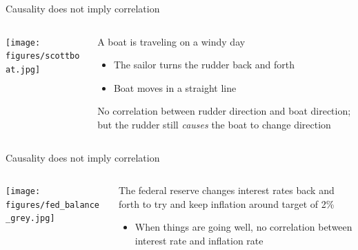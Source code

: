 \documentclass[aspectratio=169,t,11pt,table]{beamer}
\begin{document}
\begin{frame}{Causality does not imply correlation}
  \begin{columns}[T]
    \begin{column}{.6\textwidth}\vspace*{-\bigskipamount}
      \begin{center}
        \texttt{[image: figures/scottboat.jpg]}
      \end{center}
    \end{column}
    \begin{column}{.4\textwidth}
      A boat is traveling on a windy day
      \begin{itemize}
        \item The sailor turns the rudder back and forth
        \item Boat moves in a straight line
      \end{itemize}
      \bigskip
      No correlation between rudder direction and boat direction; but the rudder still \emph{causes} the boat to change direction
    \end{column}
  \end{columns}
\end{frame}

\begin{frame}{Causality does not imply correlation}
  \begin{columns}[T]
    \begin{column}{.6\textwidth}
			\vspace*{-\bigskipamount}
      \begin{center}
        \texttt{[image: figures/fed\_balance\_grey.jpg]}
      \end{center}
    \end{column}
    \begin{column}{.4\textwidth}
      The federal reserve changes interest rates back and forth to try and keep inflation around target of 2\% 
      \begin{itemize}
        \item When things are going well, no correlation between interest rate and inflation rate
      \end{itemize}
    \end{column}
  \end{columns}
\end{frame}
\end{document}
